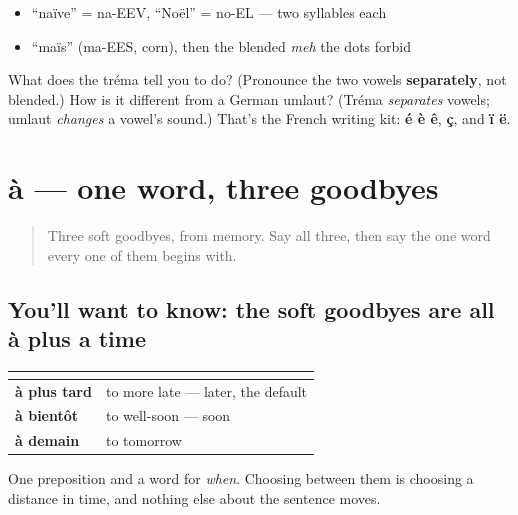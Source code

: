 \begin{itemize}
\raggedright
  \item \textquotedblleft{}naïve\textquotedblright{} = na-EEV, \textquotedblleft{}Noël\textquotedblright{} = no-EL — two syllables each
  \item \textquotedblleft{}maïs\textquotedblright{} (ma-EES, corn), then the blended \emph{meh} the dots forbid
\end{itemize}

\begin{tcolorbox}[breakable,colback=teal!4,colframe=teal!35!black,title={Before you move on}]
What does the tréma tell you to do? (Pronounce the two vowels \textbf{separately}, not blended.) How is it different from a German umlaut? (Tréma \emph{separates} vowels; umlaut \emph{changes} a vowel's sound.) That's the French writing kit: \textbf{é è ê}, \textbf{ç}, and \textbf{ï ë}.
\end{tcolorbox}
\section[à]{à — one word, three goodbyes}

\label{lesson:FR-R05-second-pass-courtesy-and-farewells}



\begin{quote}
Three soft goodbyes, from memory. Say all three, then say the one word every one of them begins with.
\end{quote}

\subsection*{You'll want to know: the soft goodbyes are all à plus a time}
\noindent
\begin{tabularx}{\linewidth}{@{}>{\raggedright\arraybackslash}X>{\raggedright\arraybackslash}X@{}}
\toprule
\textbf{} & \textbf{} \\
\midrule
\textbf{à plus tard} & to more late — later, the default \\
\textbf{à bientôt} & to well-soon — soon \\
\textbf{à demain} & to tomorrow \\
\bottomrule
\end{tabularx}

One preposition and a word for \emph{when}. Choosing between them is choosing a distance in time, and nothing else about the sentence moves.

